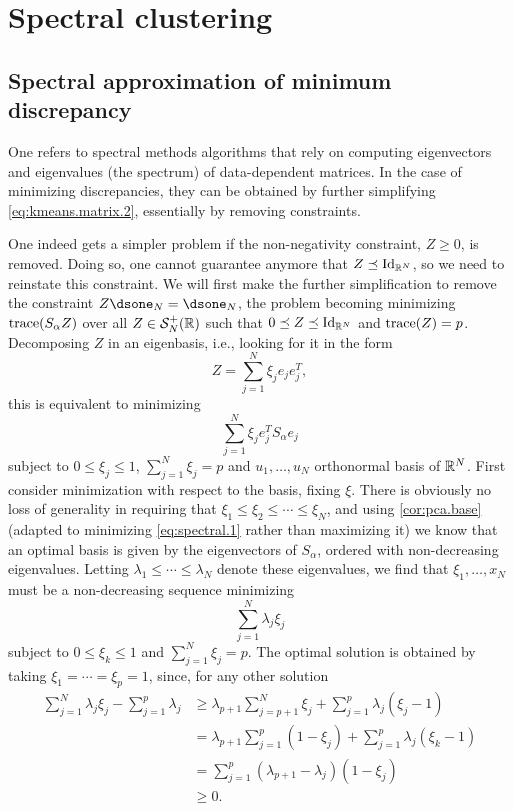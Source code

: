 \section{Spectral clustering}
\label{sec:min.disp}
 
\subsection{Spectral approximation of minimum discrepancy}
\label{sec:spectral.clus}

One refers to spectral methods algorithms that rely on computing eigenvectors and eigenvalues (the spectrum) of data-dependent matrices. In the case of minimizing discrepancies, they can be obtained by further simplifying \cref{eq:kmeans.matrix.2}, essentially by removing constraints.

One indeed gets a simpler problem if the non-negativity constraint, $Z\geq 0$, is removed. Doing so, one cannot guarantee anymore that $Z\preceq \Id[N]$, so we need to reinstate this constraint. We will first make the further simplification to remove the constraint $Z\dsone_N = \dsone_N$, the problem becoming minimizing ${\mathrm{trace}}(S_\alpha Z)$ over all $Z\in {\mathcal S}_N^+({\mathbb{R}})$ such that $0\preceq Z \preceq \Id[N]$ and ${\mathrm{trace}}(Z) = p$. Decomposing $Z$ in an eigenbasis, i.e., looking for it in the form
\[
Z = \sum_{j=1}^N \xi_j e_je_j^T, 
\]
this is equivalent to minimizing
\begin{equation}
\sum_{j=1}^N \xi_j e_j^TS_\alpha e_j
\label{eq:spectral.1}
\end{equation}
subject to $0\leq \xi_j \leq 1$, $\sum_{j=1}^N \xi_j = p$ and $u_1, \ldots, u_N$ orthonormal basis of ${\mathbb{R}}^N$. First consider  minimization with respect to the basis, fixing $\xi$. 
There is obviously no loss of generality in requiring that $\xi_1 \leq \xi_2 \leq \cdots \leq \xi_N$, and using \cref{cor:pca.base} (adapted to minimizing \cref{eq:spectral.1} rather than maximizing it) we know that an optimal basis is given by the eigenvectors of $S_\alpha$, ordered with non-decreasing eigenvalues. Letting $\lambda_1 \leq \cdots \leq \lambda_N$ denote these eigenvalues, we find that $\xi_1, \ldots, x_N$ must be a non-decreasing sequence minimizing
\[
\sum_{j=1}^N \lambda_j \xi_j
\]
subject to $0\leq \xi_k \leq 1$ and $\sum_{j=1}^N \xi_j = p$. The optimal solution is obtained by taking $\xi_1 = \cdots = \xi_p = 1$, since, for any other solution
\begin{align*}
\label{eq:spectral.2}
\sum_{j=1}^N \lambda_j \xi_j - \sum_{j=1}^p \lambda_j &\geq 
\lambda_{p+1} \sum_{j=p+1}^N \xi_j + \sum_{j=1}^p \lambda_j(\xi_j - 1)\\
&=  \lambda_{p+1} \sum_{j=1}^p (1-\xi_j) + \sum_{j=1}^p \lambda_j(\xi_k - 1)\\
&= \sum_{j=1}^p (\lambda_{p+1} - \lambda_j)(1-\xi_j) 
\\ &\geq 0.
\end{align*}

